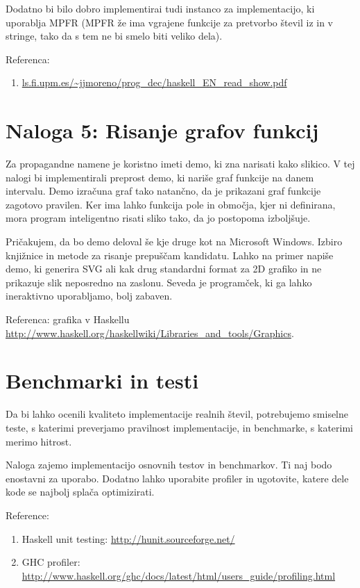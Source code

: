 \documentclass[a4paper]{article}
\begin{document}
Dodatno bi bilo dobro implementirai tudi instanco za implementacijo,
ki uporablja MPFR (MPFR že ima vgrajene funkcije za pretvorbo števil
iz in v stringe, tako da s tem ne bi smelo biti veliko dela).

Referenca:
%
\begin{enumerate}
\item \url{ls.fi.upm.es/~jjmoreno/prog_dec/haskell_EN_read_show.pdf}
\end{enumerate}

\section*{Naloga 5: Risanje grafov funkcij}

Za propagandne namene je koristno imeti demo, ki zna narisati kako
slikico. V tej nalogi bi implementirali preprost demo, ki nariše graf
funkcije na danem intervalu. Demo izračuna graf tako natančno, da je
prikazani graf funkcije zagotovo pravilen. Ker ima lahko funkcija
pole in območja, kjer ni definirana, mora program inteligentno risati
sliko tako, da jo postopoma izboljšuje.

Pričakujem, da bo demo deloval še kje druge kot na Microsoft Windows.
Izbiro knjižnice in metode za risanje prepuščam kandidatu. Lahko na
primer napiše demo, ki generira SVG ali kak drug standardni format za
2D grafiko in ne prikazuje slik neposredno na zaslonu. Seveda je
programček, ki ga lahko ineraktivno uporabljamo, bolj zabaven.

Referenca: grafika v Haskellu \url{http://www.haskell.org/haskellwiki/Libraries_and_tools/Graphics}.

\section*{Benchmarki in testi}

Da bi lahko ocenili kvaliteto implementacije realnih števil,
potrebujemo smiselne teste, s katerimi preverjamo pravilnost
implementacije, in benchmarke, s katerimi merimo hitrost.

Naloga zajemo implementacijo osnovnih testov in benchmarkov. Ti naj
bodo enostavni za uporabo. Dodatno lahko uporabite profiler in
ugotovite, katere dele kode se najbolj splača optimizirati.

Reference:
%
\begin{enumerate}
\item Haskell unit testing: \url{http://hunit.sourceforge.net/}
\item GHC profiler: \url{http://www.haskell.org/ghc/docs/latest/html/users_guide/profiling.html}
\end{enumerate}
\end{document}
